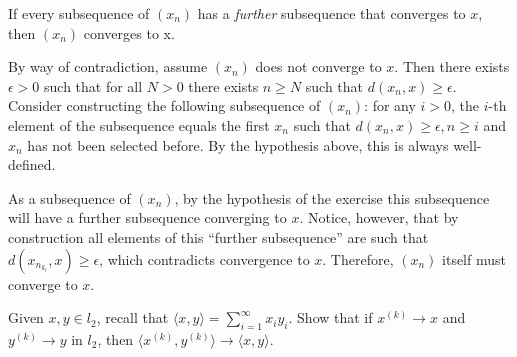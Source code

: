 \begin{exercise}{39}
    If every subsequence of $(x_n)$ has a \textit{further} subsequence that converges to $x$, then $(x_n)$ converges to x.
\end{exercise}

\begin{solution}

    By way of contradiction, assume $(x_n)$ does not converge to $x$.
    Then there exists $\epsilon > 0$ such that for all $N > 0$ there exists $n \geq N$ such that $d(x_n, x) \geq \epsilon$.
    Consider constructing the following subsequence of $(x_n)$: for any $i > 0$, the $i$-th element of the subsequence equals the first $x_n$ such that $d(x_n, x) \geq \epsilon, n \geq i$ and $x_n$ has not been selected before.
    By the hypothesis above, this is always well-defined.

    As a subsequence of $(x_n)$, by the hypothesis of the exercise this subsequence will have a further subsequence converging to $x$.
    Notice, however, that by construction all elements of this ``further subsequence'' are such that $d(x_{n_{k_l}}, x) \geq \epsilon$, which contradicts convergence to $x$.
    Therefore, $(x_n)$ itself must converge to $x$.
\end{solution}

\begin{exercise}{41}
    Given $x, y \in l_2$, recall that $\langle x, y \rangle = \sum_{i=1}^{\infty} x_i y_i$.
    Show that if $x^{(k)} \rightarrow x$ and $y^{(k)} \rightarrow y$ in $l_2$, then $\langle x^{(k)}, y^{(k)} \rangle \rightarrow \langle x, y \rangle$.
\end{exercise}

